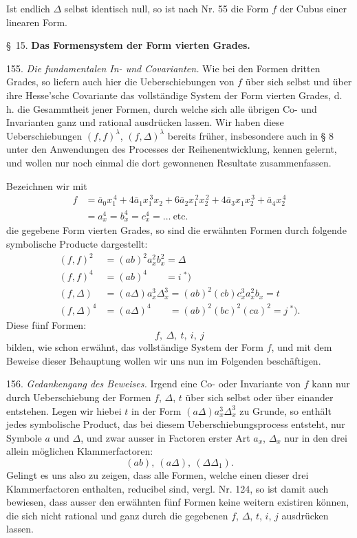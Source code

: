 Ist endlich $\Delta$ selbst identisch null, so ist nach Nr. 55 die Form $f$ der Cubus einer linearen Form.

\begin{center}
\S\ 15. \textbf{Das Formensystem der Form vierten Grades.}
\end{center}

155. \textit{Die fundamentalen In- und Covarianten.} Wie bei den Formen dritten Grades, so liefern auch hier die Ueberschiebungen von $f$ über sich selbst und über ihre Hesse'sche Covariante das vollständige System der Form vierten Grades, d. h. die Gesammtheit jener Formen, durch welche sich alle übrigen Co- und Invarianten ganz und rational ausdrücken lassen. Wir haben diese Ueberschiebungen $(f,f)^\lambda$, $(f,\Delta)^\lambda$ bereits früher, insbesondere auch in § 8 unter den Anwendungen des Processes der Reihenentwicklung, kennen gelernt, und wollen nur noch einmal die dort gewonnenen Resultate zusammenfassen.



Bezeichnen wir mit
\[
\begin{aligned}
f&=\bar a_0x_1^{\,4}+4\bar a_1x_1^{\,3}x_2+6\bar a_2x_1^{\,2}x_2^{\,2}+4\bar a_3x_1x_2^{\,3}+\bar a_4x_2^{\,4}\\
&=a_x^4=b_x^4=c_x^4=\dots\ \text{etc.}
\end{aligned}
\]
die gegebene Form vierten Grades, so sind die erwähnten Formen durch folgende symbolische Producte dargestellt:
\[
\begin{aligned}
(f,f)^2&=(ab)^2a_x^2b_x^2=\Delta\\
(f,f)^4&=(ab)^4\phantom{a_x^2b_x^2}=i\ {}^{\ast})\\
(f,\Delta)&=(a\Delta)a_x^3\Delta_x^3=(ab)^2(cb)c_x^3a_x^2b_x=t\\
(f,\Delta)^4&=(a\Delta)^4\phantom{a_x^2b_x^2}=(ab)^2(bc)^2(ca)^2=j\ {}^{\ast}).
\end{aligned}
\]
Diese fünf Formen:
\[
f,\ \Delta,\ t,\ i,\ j
\]
bilden, wie schon erwähnt, das vollständige System der Form $f$, und mit dem Beweise dieser Behauptung wollen wir uns nun im Folgenden beschäftigen.

156. \textit{Gedankengang des Beweises.} Irgend eine Co- oder Invariante von $f$ kann nur durch Ueberschiebung der Formen $f$, $\Delta$, $t$ über sich selbst oder über einander entstehen. Legen wir hiebei $t$ in der Form $(a\Delta)a_x^3\Delta_x^3$ zu Grunde, so enthält jedes symbolische Product, das bei diesem Ueberschiebungsprocess entsteht, nur Symbole $a$ und $\Delta$, und zwar ausser in Factoren erster Art $a_x$, $\Delta_x$ nur in den drei allein möglichen Klammerfactoren:
\[
(ab),\ (a\Delta),\ (\Delta\Delta_1).
\]
Gelingt es uns also zu zeigen, dass alle Formen, welche einen dieser drei Klammerfactoren enthalten, reducibel sind, vergl. Nr. 124, so ist damit auch bewiesen, dass ausser den erwähnten fünf Formen keine weitern existiren können, die sich nicht rational und ganz durch die gegebenen $f$, $\Delta$, $t$, $i$, $j$ ausdrücken lassen.

